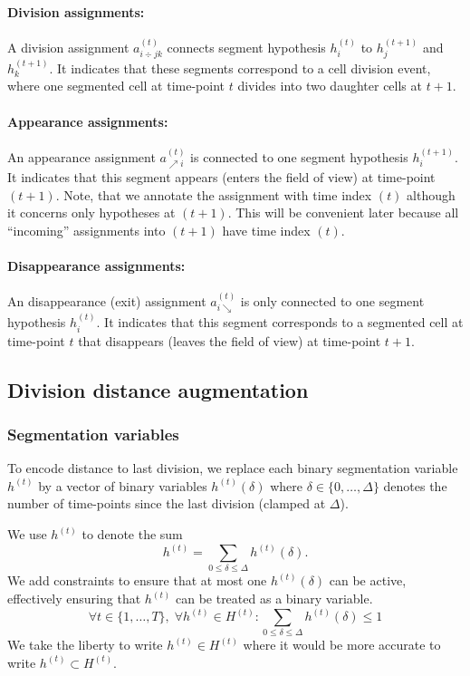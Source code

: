 \documentclass[a4paper]{article}
\newcommand{\set}[1]{\ensuremath{\{#1\}}}
\newcommand{\hypset}[1]{\ensuremath{H^{(#1)}}\xspace}
\newcommand{\vhset}[1]{\hypset{#1}}
\newcommand{\Ht}[1][t]{\vhset{#1}}
\newcommand{\vht}[1][t]{\ensuremath{h^{(#1)}}\xspace}
\newcommand{\vhtd}[2][t]{\ensuremath{h^{(#1)}\left({#2}\right)}\xspace}
\newcommand{\vhti}[2][t]{\ensuremath{h^{(#1)}_{#2}}\xspace}
\newcommand{\vad}[3]{\ensuremath{a^{(#1)}_{#2\div#3}}\xspace}
\newcommand{\vaa}[2]{\ensuremath{a^{(#1)}_{\nearrow#2}}\xspace}
\newcommand{\vae}[2]{\ensuremath{a^{(#1)}_{#2\searrow}}\xspace}
\begin{document}
\paragraph{Division assignments:}
A division assignment \vad{t}{i}{jk} connects segment hypothesis \vhti{i} to \vhti[t+1]{j} and \vhti[t+1]{k}.
It indicates that these segments correspond to a cell division event, where one segmented cell at time-point $t$ divides into two daughter cells at $t+1$.
%
\paragraph{Appearance assignments:}
An appearance assignment \vaa{t}{i} is connected to one segment hypothesis \vhti[t+1]{i}. It indicates that this segment appears (enters the field of view) at time-point $(t+1)$. Note, that we annotate the assignment with time index $(t)$ although it concerns only hypotheses at $(t+1)$. This will be convenient later because all ``incoming'' assignments into $(t+1)$ have time index $(t)$.
%
\paragraph{Disappearance assignments:}
An disappearance (exit) assignment \vae{t}{i} is only connected to one segment hypothesis \vhti{i}. It indicates that this segment corresponds to a segmented cell at time-point $t$ that disappears (leaves the field of view) at time-point $t+1$.

%
\subsection{Division distance augmentation}
\subsubsection{Segmentation variables}
%
To encode distance to last division, we replace each binary segmentation variable \vht by a vector of binary variables \vhtd{\delta} where $\delta\in\set{0,\dots,\Delta}$ denotes the number of time-points since the last division (clamped at $\Delta$).

We use \vht to denote the sum
\begin{equation}
	\vht = \sum_{0 \leq \delta \leq \Delta} \vhtd{\delta}.
\end{equation}
We add constraints to ensure that at most one \vhtd{\delta} can be active, effectively ensuring that $\vht$ can be treated as a binary variable.
\begin{equation}\label{eq:atmostonehdelta}
  \forall t \in \set{1, \dots, T},\;
  \forall \vht \in \Ht:
		\sum_{0 \leq \delta \leq \Delta} \vhtd{\delta}
  	\leq 1
\end{equation}
We take the liberty to write $\vht \in \Ht$ where it would be more accurate to write $\vht \subset \Ht$.
\end{document}
